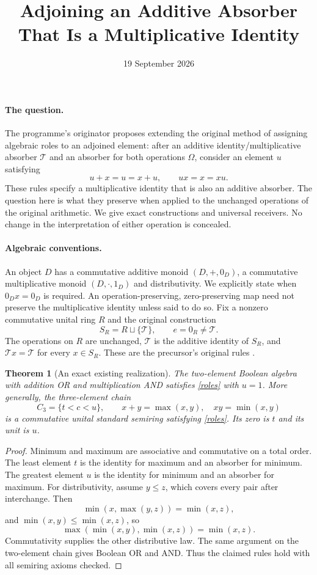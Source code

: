 \documentclass[11pt]{article}
\title{Adjoining an Additive Absorber That Is a Multiplicative Identity}
\author{}
\date{19 September 2026}
\newtheorem{theorem}{Theorem}
\begin{document}
\maketitle

\paragraph{The question.}
The programme's originator proposes extending the original method of assigning algebraic roles to an adjoined element: after an additive identity/multiplicative absorber $\mathcal T$ and an absorber for both operations $\Omega$, consider an element $u$ satisfying
\begin{equation}\label{roles}
u+x=u=x+u,\qquad ux=x=xu.
\end{equation}
These rules specify a multiplicative identity that is also an additive absorber. The question here is what they preserve when applied to the unchanged operations of the original arithmetic. We give exact constructions and universal receivers. No change in the interpretation of either operation is concealed.

\paragraph{Algebraic conventions.}
An object $D$ has a commutative additive monoid $(D,+,0_D)$, a commutative multiplicative monoid $(D,\cdot,1_D)$ and distributivity. We explicitly state when $0_Dx=0_D$ is required. An operation-preserving, zero-preserving map need not preserve the multiplicative identity unless said to do so. Fix a nonzero commutative unital ring $R$ and the original construction
\[
S_R=R\sqcup\{\mathcal T\},\qquad e=0_R\ne\mathcal T.
\]
The operations on $R$ are unchanged, $\mathcal T$ is the additive identity of $S_R$, and $\mathcal T x=\mathcal T$ for every $x\in S_R$. These are the precursor's original rules \cite{origin}.

\begin{theorem}[An exact existing realization]
The two-element Boolean algebra with addition OR and multiplication AND satisfies \eqref{roles} with $u=1$. More generally, the three-element chain
\[
C_3=\{t<c<u\},\qquad x+y=\max(x,y),\quad xy=\min(x,y)
\]
is a commutative unital standard semiring satisfying \eqref{roles}. Its zero is $t$ and its unit is $u$.
\end{theorem}
\begin{proof}
Minimum and maximum are associative and commutative on a total order. The least element $t$ is the identity for maximum and an absorber for minimum. The greatest element $u$ is the identity for minimum and an absorber for maximum. For distributivity, assume $y\le z$, which covers every pair after interchange. Then
\[
\min(x,\max(y,z))=\min(x,z),
\]
and $\min(x,y)\le\min(x,z)$, so
\[
\max(\min(x,y),\min(x,z))=\min(x,z).
\]
Commutativity supplies the other distributive law. The same argument on the two-element chain gives Boolean OR and AND. Thus the claimed rules hold with all semiring axioms checked.
\end{proof}
\end{document}
